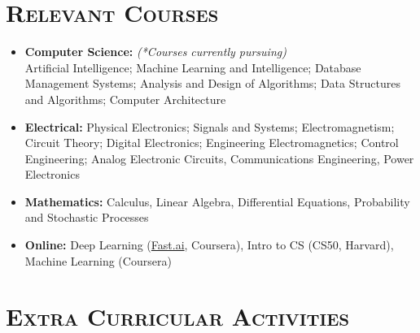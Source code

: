 \documentclass{article}
\newenvironment{longversion}{}{} %
\newcommand{\tmpsection}[1]{}
\let\tmpsection=\section
\renewcommand{\section}[1]{\tmpsection*{\textsc{#1}}}
\begin{document}
\begin{longversion}
\section{Relevant Courses}
\begin{itemize}
\setlength\itemsep{-1em}

\item \textbf{Computer Science:} \hfill \textit{(*Courses currently pursuing)}\\
Artificial Intelligence; Machine Learning and Intelligence; Database Management Systems; Analysis and Design of Algorithms; Data Structures and Algorithms; Computer Architecture\\

\item \textbf{Electrical:}
Physical Electronics; Signals and Systems; Electromagnetism; Circuit Theory; Digital Electronics; Engineering Electromagnetics; Control Engineering; Analog Electronic Circuits, Communications Engineering, Power Electronics\\ 

\item \textbf{Mathematics:} Calculus, Linear Algebra, Differential Equations, Probability and Stochastic Processes\\

\item \textbf{Online:}
Deep Learning (\href{http://www.fast.ai/}{Fast.ai}, Coursera), Intro to CS (CS50, Harvard), Machine Learning (Coursera)

\end{itemize}
\end{longversion}



\section{Extra Curricular Activities}
\end{document}
